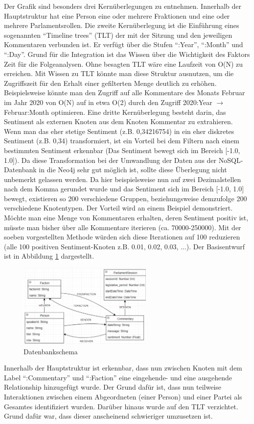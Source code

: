 Der Grafik sind besonders drei Kernüberlegungen zu entnehmen. Innerhalb der Hauptstruktur hat eine Person eine oder mehrere Fraktionen und eine oder mehrere Parlamentsrollen. Die zweite Kernüberlegung ist die Einführung eines sogenannten \enquote{Timeline trees} (TLT) \cite{robinson2015graph} der mit der Sitzung und den jeweiligen Kommentaren verbunden ist. Er verfügt über die Stufen \enquote{:Year}, \enquote{:Month} und \enquote{:Day}. Grund für die Integration ist das Wissen über die Wichtigkeit des Faktors Zeit für die Folgeanalysen. Ohne besagten TLT wäre eine Laufzeit von O(N) zu erreichen. Mit Wissen zu TLT könnte man diese Struktur ausnutzen, um die Zugriffszeit für den Erhalt einer gefilterten Menge deutlich zu erhöhen. Beispielsweise könnte man den Zugriff auf alle Kommentare des Monats Februar im Jahr 2020 von O(N) auf in etwa O(2) durch den Zugriff 2020:Year $\rightarrow$ Februar:Month optimieren.
\newline
Eine dritte Kernüberlegung besteht darin, das Sentiment als externen Knoten aus dem Knoten Kommentar zu extrahieren. Wenn man das eher stetige Sentiment (z.B. 0,34216754) in ein eher diskretes Sentiment (z.B. 0,34) transformiert, ist ein Vorteil bei dem Filtern nach einem bestimmten Sentiment erkennbar (Das Sentiment bewegt sich im Bereich [-1.0, 1.0]). Da diese Transformation bei der Umwandlung der Daten aus der NoSQL-Datenbank in die Neo4j sehr gut möglich ist, sollte diese Überlegung nicht unbemerkt gelassen werden. Da hier beispielsweise nun auf zwei Dezimalstellen nach dem Komma gerundet wurde und das Sentiment sich im Bereich [-1.0, 1.0] bewegt, existieren so 200 verschiedene Gruppen, beziehungsweise demzufolge 200 verschiedene Knotentypen. Der Vorteil wird an einem Beispiel demonstriert. Möchte man eine Menge von Kommentaren erhalten, deren Sentiment positiv ist, müsste man bisher über alle Kommentare iterieren (ca. 70000-250000). Mit der soeben vorgestellten Methode würden sich diese Iterationen auf 100 reduzieren (alle 100 positiven Sentiment-Knoten z.B. 0.01, 0.02, 0.03, ...). Der Basisentwurf ist in Abbildung \ref{fig:chapters/05-Interaktion-Abgeord/image9.png} dargestellt.
\begin{figure}[htb]
    \centering
    \includegraphics[width=250px]{chapters/05-Interaktion-Abgeord/diagramm.png} 
    \caption{Datenbankschema}
    \label{fig:chapters/05-Interaktion-Abgeord/image9.png}
\end{figure}
Innerhalb der Hauptstruktur ist erkennbar, dass nun zwischen Knoten mit dem Label \enquote{:Commentary} und \enquote{:Faction} eine eingehende- und eine ausgehende Relationship hinzugefügt wurde. Der Grund dafür ist, dass nun teilweise Interaktionen zwischen einem Abgeordneten (einer Person) und einer Partei als Gesamtes identifiziert wurden. Darüber hinaus wurde auf den TLT verzichtet. Grund dafür war, dass dieser anscheinend schwieriger umzusetzen ist.
